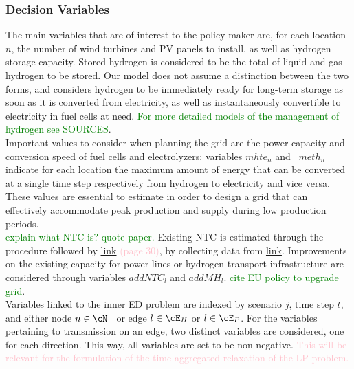 
\subsubsection{Decision Variables}

The main variables that are of interest to the policy maker are, for each location $n$, the number of wind turbines and PV panels to install, as well as hydrogen storage capacity.
Stored hydrogen is considered to be the total of liquid and gas hydrogen to be stored. Our model does not assume a distinction between the two forms, and considers hydrogen to be immediately ready for long-term storage as soon as it is converted from electricity, as well as instantaneously convertible to electricity in fuel cells at need. \textcolor{Green}{For more detailed models of the management of hydrogen see SOURCES}.\\
\indent Important values to consider when planning the grid are the power capacity and conversion speed of fuel cells and electrolyzers: variables $mhte_n$ and  $meth_n$ indicate for each location the maximum amount of energy that can be converted at a single time step respectively from hydrogen to electricity and vice versa. These values are essential to estimate in order to design a grid that can effectively accommodate peak production and supply during low production periods.\\
\indent \textcolor{Green}{explain what NTC is? quote paper.} Existing NTC is estimated through the procedure followed by \hyperlink{https://www.diva-portal.org/smash/get/diva2:1476768/FULLTEXT01.pdf}{link} \textcolor{pink}{(page 30)}, by collecting data from \hyperlink{https://transparency.entsoe.eu/transmission-domain/physicalFlow/show?name=&defaultValue=false&viewType=TABLE&areaType=BORDER_CTY&atch=false&dateTime.dateTime=22.07.2024+00:00|CET|DAY&border.values=CTY|10YGR-HTSO-----Y!CTY_CTY|10YGR-HTSO-----Y_CTY_CTY|10YIT-GRTN-----B&dateTime.timezone=CET_CEST&dateTime.timezone_input=CET+(UTC+1)+/+CEST+(UTC+2)}{link}. Improvements on the existing capacity for power lines or hydrogen transport infrastructure are considered through variables $addNTC_l$ and $addMH_l$. \textcolor{Green}{cite EU policy to upgrade grid}.\\
\indent Variables linked to the inner ED problem are indexed by scenario \(j\), time step \(t\), and either node \(n \in \cN\)  or edge $l\in\cE_H$ or $l \in \cE_P$. For the variables pertaining to transmission on an edge, two distinct variables are considered, one for each direction. This way, all variables are set to be non-negative. \textcolor{pink}{This will be relevant for the formulation of the time-aggregated relaxation of the LP problem.}\\

